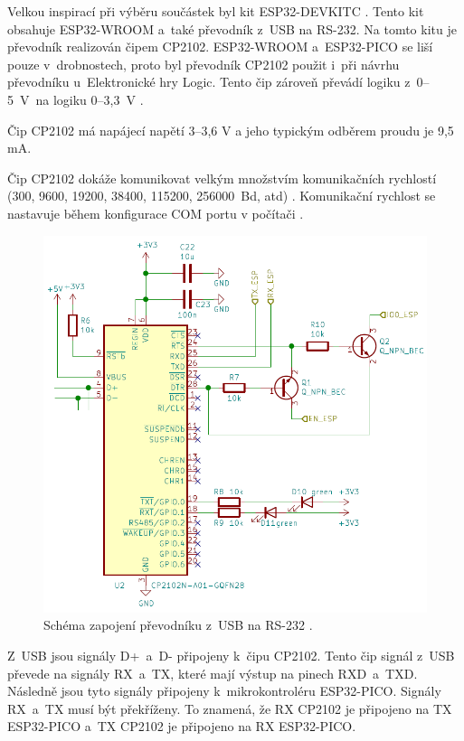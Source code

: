   Velkou inspirací při výběru součástek byl kit ESP32-DEVKITC \cite{Devkit_schema}. Tento kit obsahuje ESP32-WROOM a~také převodník
  z~USB na RS-232. Na tomto kitu je převodník realizován čipem CP2102. ESP32-WROOM a~ESP32-PICO se liší pouze v~drobnostech, 
  proto byl převodník CP2102 použit i~při návrhu převodníku u~Elektronické hry Logic.  Tento čip zároveň převádí logiku 
  z~0--5~V~na logiku 0--3,3~V \cite{CP2102_datasheet}. 

 Čip CP2102 má napájecí napětí 3--3,6 V a jeho typickým odběrem proudu je 9,5 mA.

  Čip CP2102 dokáže komunikovat velkým množstvím komunikačních rychlostí (300, 9600, 19200, 38400, 115200, 256000~Bd, atd) 
  \cite{CP2102_datasheet}. Komunikační rychlost se nastavuje během konfigurace COM portu v počítači \cite{CP2102_datasheet}.

  \begin{figure}[!h]
      \begin{center}
        \includegraphics[scale=0.6]{obrazky/CP2102_schema.png}
      \end{center}
      \caption[Schéma zapojení převodníku z~USB na RS-232 \cite{Devkit_schema}]{Schéma zapojení převodníku z~USB na RS-232 \cite{Devkit_schema}.}
  \end{figure}

  Z~USB jsou signály D+~a~D- připojeny k~čipu CP2102. Tento čip signál z~USB převede na signály RX~a~TX, které mají výstup 
  na pinech RXD~a~TXD. Následně jsou tyto signály připojeny k~mikrokontroléru ESP32-PICO. Signály RX~a~TX musí být překříženy. To znamená, že RX CP2102
  je připojeno na TX ESP32-PICO a~TX CP2102 je připojeno na RX ESP32-PICO. 

